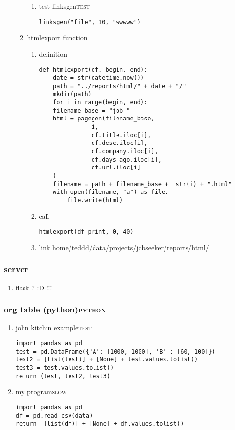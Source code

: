 \documentclass[11pt]{article}
\begin{document}
\begin{enumerate}
\begin{enumerate}
\begin{enumerate}
\item test linksgen\hfill{}\textsc{test}
\label{sec:org34e6aae}
\begin{verbatim}
linksgen("file", 10, "wwwww")
\end{verbatim}
\end{enumerate}
\item htmlexport function
\label{sec:orgbba83af}
\begin{enumerate}
\item definition
\label{sec:org5707527}
\begin{verbatim}
def htmlexport(df, begin, end):
    date = str(datetime.now())
    path = "../reports/html/" + date + "/"
    mkdir(path)
    for i in range(begin, end):
	filename_base = "job-"
	html = pagegen(filename_base,
		       i,
		       df.title.iloc[i],
		       df.desc.iloc[i],
		       df.company.iloc[i],
		       df.days_ago.iloc[i],
		       df.url.iloc[i]
	)
	filename = path + filename_base +  str(i) + ".html"
	with open(filename, "a") as file:
	    file.write(html)

\end{verbatim}

\item call
\label{sec:org5e1d97c}
\begin{verbatim}
htmlexport(df_print, 0, 40)
\end{verbatim}

\item link
\label{sec:org8b4a05f}
\url{home/teddd/data/projects/jobseeker/reports/html/}
\end{enumerate}
\end{enumerate}
\end{enumerate}
\subsubsection{server}
\label{sec:orge555d4b}
\begin{enumerate}
\item flask ? :D !!!
\label{sec:org054f815}
\end{enumerate}
\subsubsection{org  table (python)\hfill{}\textsc{python}}
\label{sec:org968c930}
\begin{enumerate}
\item john kitchin example\hfill{}\textsc{test}
\label{sec:org761b777}
\begin{verbatim}
import pandas as pd
test = pd.DataFrame({'A': [1000, 1000], 'B' : [60, 100]})
test2 = [list(test)] + [None] + test.values.tolist()
test3 = test.values.tolist()
return (test, test2, test3)
\end{verbatim}

\item my program\hfill{}\textsc{slow}
\label{sec:orge6c64c9}
\begin{verbatim}
import pandas as pd
df = pd.read_csv(data)
return  [list(df)] + [None] + df.values.tolist()
\end{verbatim}
\end{enumerate}
\end{document}
